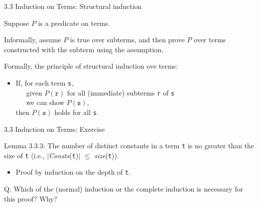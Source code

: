 \documentclass[table]{beamer}
\begin{document}
\begin{frame}[t]{3.3 Induction on Terms: Structural induction} 

Suppose $P$ is a predicate on terms.

\vspace{10pt}

Informally, assume $P$ is true over subterms, and then prove $P$ over terms constructed with the subterm using the assumption.

\vspace{10pt}

Formally, the principle of structural induction ove terms:
\begin{itemize}
\item If, for each term \texttt{s}, \\
 \ \ \ given $P(\texttt{r})$ for all (immediate) subterms \texttt{r} of \texttt{s} \\
 \ \ \ we can show $P(\texttt{s})$, \\
 then $P(\texttt{s})$ holds for all \texttt{s}.
\end{itemize}
 
\end{frame}


\begin{frame}[t]{3.3 Induction on Terms: Exercise} 

Lemma 3.3.3: The number of distinct constants in a term \texttt{t} is no greater than the size of \texttt{t} (i.e., $|$\textit{Consts}(\texttt{t})$|$ $\leq$ \textit{size}(\texttt{t})).
\begin{itemize}
\item
Proof by induction on the depth of \texttt{t}.
\end{itemize}

\vspace{10pt}

Q. Which of the (normal) induction or the complete induction is necessary for this proof? Why?

\end{frame}
\end{document}
